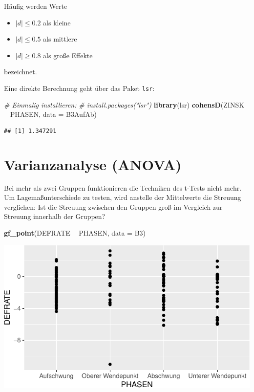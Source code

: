 \documentclass[12pt,ngerman,paper=a4,pagesize,DIV=13]{scrreprt}
\newenvironment{Shaded}{\begin{snugshade}}{\end{snugshade}}
\newcommand{\CommentTok}[1]{\textcolor[rgb]{0.56,0.35,0.01}{\textit{#1}}}
\newcommand{\DataTypeTok}[1]{\textcolor[rgb]{0.13,0.29,0.53}{#1}}
\newcommand{\KeywordTok}[1]{\textcolor[rgb]{0.13,0.29,0.53}{\textbf{#1}}}
\newcommand{\NormalTok}[1]{#1}
\newcommand{\OperatorTok}[1]{\textcolor[rgb]{0.81,0.36,0.00}{\textbf{#1}}}
\newcommand{\StringTok}[1]{\textcolor[rgb]{0.31,0.60,0.02}{#1}}
\providecommand{\tightlist}{%
  \setlength{\itemsep}{0pt}\setlength{\parskip}{0pt}}
\begin{document}
Häufig werden Werte

\begin{itemize}
\tightlist
\item
  \(|d|\leq 0.2\) als kleine
\item
  \(|d|\leq 0.5\) als mittlere
\item
  \(|d|\geq 0.8\) als große Effekte
\end{itemize}

bezeichnet.

Eine direkte Berechnung geht über das Paket \texttt{lsr}:

\begin{Shaded}
\begin{Highlighting}[]
\CommentTok{# Einmalig installieren:}
\CommentTok{# install.packages("lsr")}
\KeywordTok{library}\NormalTok{(lsr)}
\KeywordTok{cohensD}\NormalTok{(ZINSK }\OperatorTok{~}\StringTok{ }\NormalTok{PHASEN, }\DataTypeTok{data =}\NormalTok{ B3AufAb)}
\end{Highlighting}
\end{Shaded}

\begin{verbatim}
## [1] 1.347291
\end{verbatim}

\hypertarget{varianzanalyse-anova}{%
\section{Varianzanalyse (ANOVA)}\label{varianzanalyse-anova}}

Bei mehr als zwei Gruppen funktionieren die Techniken des t-Tests nicht
mehr. Um Lagemaßunterschiede zu testen, wird anstelle der Mittelwerte
die Streuung verglichen: Ist die Streuung zwischen den Gruppen groß im
Vergleich zur Streuung innerhalb der Gruppen?

\begin{Shaded}
\begin{Highlighting}[]
\KeywordTok{gf_point}\NormalTok{(DEFRATE }\OperatorTok{~}\StringTok{ }\NormalTok{PHASEN, }\DataTypeTok{data =}\NormalTok{ B3)}
\end{Highlighting}
\end{Shaded}

\includegraphics{DatenerhebungStatistik-Uebung_files/figure-latex/unnamed-chunk-147-1.pdf}
\end{document}
